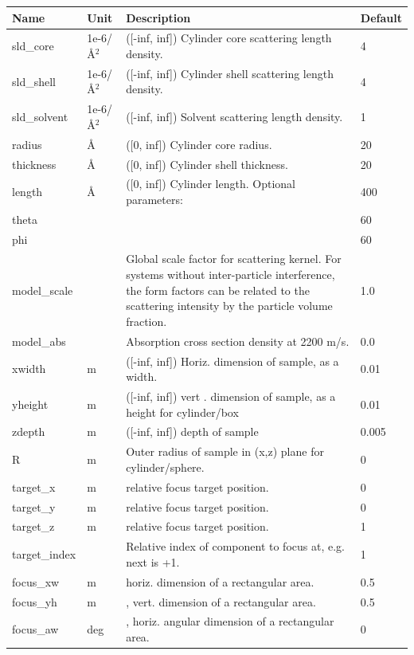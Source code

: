 \begin{longtable}{p{}p{}p{}p{}}
\toprule
\textbf{Name} & \textbf{Unit} & \textbf{Description} & \textbf{Default} \\
\midrule
\endhead
sld\_core & 1e-6/\AA{}$^{2}$ & ([-inf, inf]) Cylinder core scattering length density. & 4 \\
sld\_shell & 1e-6/\AA{}$^{2}$ & ([-inf, inf]) Cylinder shell scattering length density. & 4 \\
sld\_solvent & 1e-6/\AA{}$^{2}$ & ([-inf, inf]) Solvent scattering length density. & 1 \\
radius & \AA{} & ([0, inf]) Cylinder core radius. & 20 \\
thickness & \AA{} & ([0, inf]) Cylinder shell thickness. & 20 \\
length & \AA{} & ([0, inf]) Cylinder length. Optional parameters: & 400 \\
theta &  &  & 60 \\
phi &  &  & 60 \\
model\_scale &   & Global scale factor for scattering kernel. For systems without inter-particle interference, the form factors can be related to the scattering intensity by the particle volume fraction. & 1.0 \\
model\_abs &   & Absorption cross section density at 2200 m/s. & 0.0 \\
xwidth & m & ([-inf, inf]) Horiz. dimension of sample, as a width. & 0.01 \\
yheight & m & ([-inf, inf]) vert . dimension of sample, as a height for cylinder/box & 0.01 \\
zdepth & m & ([-inf, inf]) depth of sample & 0.005 \\
R & m & Outer radius of sample in (x,z) plane for cylinder/sphere. & 0 \\
target\_x & m & relative focus target position. & 0 \\
target\_y & m & relative focus target position. & 0 \\
target\_z & m & relative focus target position. & 1 \\
target\_index &   & Relative index of component to focus at, e.g. next is +1. & 1 \\
focus\_xw & m & horiz. dimension of a rectangular area. & 0.5 \\
focus\_yh & m & , vert. dimension of a rectangular area. & 0.5 \\
focus\_aw & deg & , horiz. angular dimension of a rectangular area. & 0 \\

\end{longtable}
